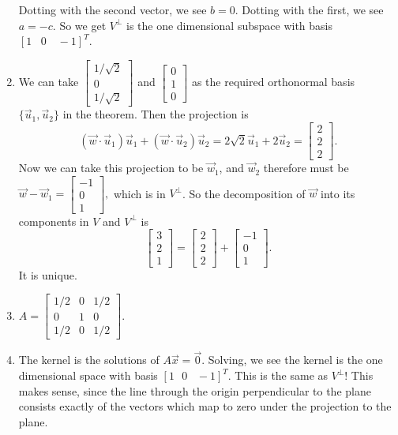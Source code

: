 \begin{SaveQuestion}
\begin{enumerate}
				Dotting with the second vector, we see $b = 0$. Dotting with the first, we see $a = -c$. So we get  $V^{\perp}$ is the one dimensional subspace with basis  $[1\,\,\,\,\, 0 \,\,\,\,\,\, -1]^T$.
        \item We can take $\begin{bmatrix} 1/\sqrt 2\\ 0 \\1/\sqrt 2 \end{bmatrix}$ and $\begin{bmatrix} 0\\ 1 \\0 \end{bmatrix}$ as the required orthonormal basis $\{\vec u_1, \vec u_2\}$ in the theorem.  Then the projection is 
				$$(\vec w \cdot \vec u_1)\vec u_1 + (\vec w \cdot \vec u_2) \vec u_2 = 2\sqrt 2 \vec u_1 + 2 \vec u_2 = \begin{bmatrix} 2\\ 2 \\2 \end{bmatrix}.
				$$
				Now we can take this projection to be $\vec w_1$, and $\vec w_2$ therefore must be $\vec w -  \vec w_1 =  \begin{bmatrix} -1\\ 0 \\1 \end{bmatrix}, $ which is in $V^{\perp}$.
				So the decomposition of $\vec w$ into its components in $V$ and $V^{\perp}$ is 
				$$
				\begin{bmatrix} 3\\ 2 \\1 \end{bmatrix} =  \begin{bmatrix} 2\\ 2 \\2 \end{bmatrix} + \begin{bmatrix} -1\\ 0 \\ 1 \end{bmatrix}.
				$$ It is unique.
        \item $A = \begin{bmatrix} 1/2 & 0  & 1/2  \\ 0 & 1  & 0  \\ 1/2 & 0  & 1/2 \end{bmatrix}$.
        \item The kernel is the solutions of $A\vec x = \vec 0$. Solving, we see the kernel is   the one dimensional space with basis $[1\,\,\,\,0 \,\,\,\,\, -1]^T$. This is the same as $V^{\perp}$! This makes sense, since the line through the origin  perpendicular to the plane consists exactly of the vectors which map to zero under the projection to the plane.

\end{enumerate}
\end{SaveQuestion}
